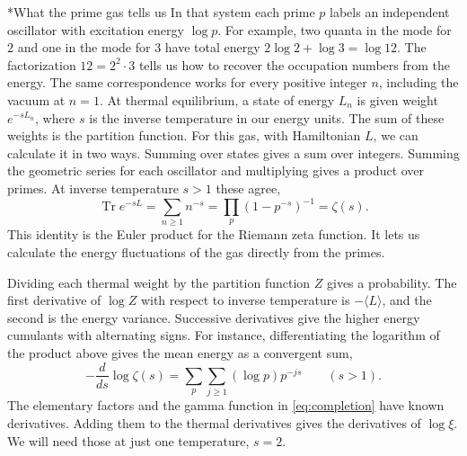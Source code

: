 \documentclass[11pt,letterpaper]{article}
\makeatletter
\renewcommand\subsection{\@startsection{subsection}{2}{\z@}{-2.0ex plus -.3ex}{.75ex}{\normalfont\normalsize\itshape}}
\newcommand{\Tr}{\operatorname{Tr}}
\numberwithin{equation}{section}
\makeatother
\begin{document}
\subsection*{What the prime gas tells us}
In that system each prime $p$ labels an independent oscillator with excitation energy $\log p$. For example, two quanta in the mode for $2$ and one in the mode for $3$ have total energy $2\log 2+\log 3=\log 12$. The factorization $12=2^2\cdot3$ tells us how to recover the occupation numbers from the energy. The same correspondence works for every positive integer $n$, including the vacuum at $n=1$. At thermal equilibrium, a state of energy $L_n$ is given weight $e^{-sL_n}$, where $s$ is the inverse temperature in our energy units. The sum of these weights is the partition function. For this gas, with Hamiltonian $L$, we can calculate it in two ways. Summing over states gives a sum over integers. Summing the geometric series for each oscillator and multiplying gives a product over primes. At inverse temperature $s>1$ these agree,
\[
 \Tr e^{-sL}=\sum_{n\ge1} n^{-s}=\prod_p(1-p^{-s})^{-1}=\zeta(s).
\]
This identity is the Euler product for the Riemann zeta function. It lets us calculate the energy fluctuations of the gas directly from the primes.

Dividing each thermal weight by the partition function $Z$ gives a probability. The first derivative of $\log Z$ with respect to inverse temperature is $-\langle L\rangle$, and the second is the energy variance. Successive derivatives give the higher energy cumulants with alternating signs. For instance, differentiating the logarithm of the product above gives the mean energy as a convergent sum,
\[
 -\frac{d}{ds}\log\zeta(s)
     =\sum_p\sum_{j\ge1}(\log p)p^{-js}\qquad (s>1).
\]
The elementary factors and the gamma function in \eqref{eq:completion} have known derivatives. Adding them to the thermal derivatives gives the derivatives of $\log\xi$. We will need those at just one temperature, $s=2$.
\end{document}
